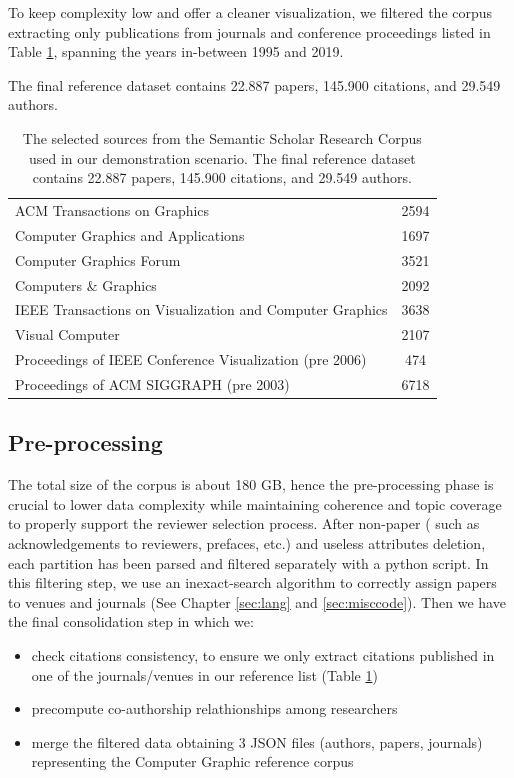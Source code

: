 To keep complexity low and offer a cleaner visualization, we filtered the corpus extracting only publications from journals and conference proceedings listed in Table \ref{table:sources}, spanning the years in-between 1995 and 2019. 

The final reference dataset contains 22.887 papers, 145.900 citations, and 29.549 authors.
\begin{table}[!ht]
\renewcommand{\arraystretch}{1.3}
\centering
\begin{tabular}{|l|c|}
\hline
ACM Transactions on Graphics & 2594\\ 
Computer Graphics and Applications  & 1697 \\ 
Computer Graphics Forum & 3521\\ 
Computers \& Graphics & 2092\\ 
IEEE Transactions on Visualization and Computer Graphics & 3638\\ 
Visual Computer & 2107\\ 
Proceedings of IEEE Conference Visualization (pre 2006) & 474 \\ 
Proceedings of ACM SIGGRAPH (pre 2003) & 6718\\
\hline
\end{tabular}
\caption{The selected sources from the Semantic Scholar Research Corpus used in our demonstration scenario. The final reference dataset contains 22.887 papers, 145.900 citations, and 29.549 authors.}
\label{table:sources}
\end{table}

%
\subsection*{Pre-processing}
\label{sec:preproc}

The total size of the corpus is about 180 GB, hence the pre-processing phase is crucial to lower data complexity while maintaining coherence and topic coverage to properly support the reviewer selection process. After non-paper ( such as acknowledgements to reviewers, prefaces, etc.) and useless attributes deletion, each partition has been parsed and filtered separately with a python script. In this filtering step, we use an inexact-search algorithm to correctly assign papers to venues and journals (See Chapter \ref{sec:lang} and \ref{sec:misccode}). Then we have the final consolidation step in which we:
\begin{itemize}
    \item check citations consistency, to ensure we only extract citations published in one of the journals/venues in our reference list (Table \ref{table:sources})
    \item precompute co-authorship relathionships among researchers
    \item merge the filtered data obtaining 3 JSON files (authors, papers, journals) representing the Computer Graphic reference corpus
\end{itemize}

